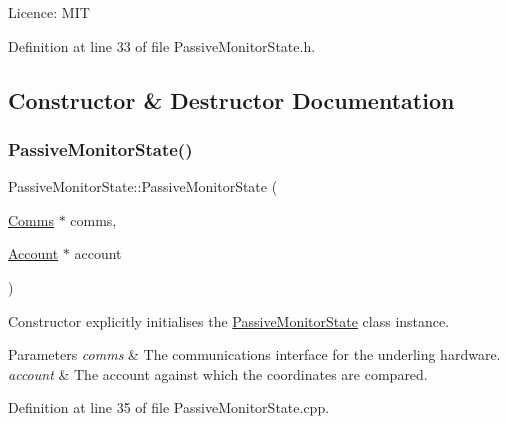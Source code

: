 Licence\+: M\+IT 

Definition at line 33 of file Passive\+Monitor\+State.\+h.



\subsection{Constructor \& Destructor Documentation}
\mbox{\label{class_passive_monitor_state_a91d992e619e8e1d3d47875a1933542b7}} 
\subsubsection{\texorpdfstring{Passive\+Monitor\+State()}{PassiveMonitorState()}}
{\footnotesize\ttfamily Passive\+Monitor\+State\+::\+Passive\+Monitor\+State (\begin{DoxyParamCaption}\item[{\hyperlink{class_comms}{Comms} $\ast$}]{comms,  }\item[{\hyperlink{class_account}{Account} $\ast$}]{account }\end{DoxyParamCaption})}

Constructor explicitly initialises the \hyperlink{class_passive_monitor_state}{Passive\+Monitor\+State} class instance.


\begin{DoxyParams}{Parameters}
{\em comms} & The communications interface for the underling hardware. \\
\hline
{\em account} & The account against which the coordinates are compared. \\
\hline
\end{DoxyParams}


Definition at line 35 of file Passive\+Monitor\+State.\+cpp.


